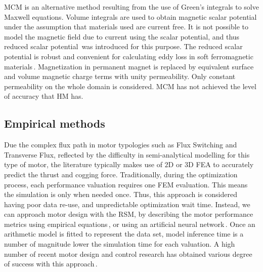         
        \ac{MCM} is an alternative method resulting from the use of Green’s integrals to solve Maxwell equations. Volume integrals are used to obtain magnetic scalar potential under the assumption that materials used are current free. It is not possible to model the magnetic field due to current using the scalar potential, and thus reduced scalar potential\,\cite{Gong2009AnalysisMethod} was introduced for this purpose. The reduced scalar potential is robust and convenient for calculating eddy loss in soft ferromagnetic materials\,\cite{Xu2004TotalCalculation,Bowler1987EddyFunctions,Rubinacci2004AComputation}. Magnetization in permanent magnet is replaced by equivalent surface and volume magnetic charge terms with unity permeability. Only constant permeability on the whole domain is considered. \acs{MCM} has not achieved the level of accuracy that \acs{HM} has.
        
    
    \subsection{Empirical methods}                  \label{Chapter:background/modelling techniques for designing motors/empirical methods}


        Due the complex flux path in motor typologies such as Flux Switching and Transverse Flux, reflected by the difficulty in semi-analytical modelling for this type of motor, the literature typically makes use of $\mathrm{2D}$ or $\mathrm{3D}$ \acs{FEA} to accurately predict the thrust and cogging force. Traditionally, during the optimization process, each performance valuation requires one FEM evaluation. This means the simulation is only when needed once. Thus, this approach is considered having poor data re-use, and unpredictable optimization wait time. Instead, we can approach motor design with the \ac{RSM}, by describing the motor performance metrics using empirical equations\,\cite{Hong2008,Lei2013}, or using an artificial neural network\,\cite{Hadjout2006,Ashabani2010OptimumApproach}. Once an arithmetic model is fitted to represent the data set, model inference time is a number of magnitude lower the simulation time for each valuation. A high number of recent motor design and control research has obtained various degree of success with this approach\,\cite{Hwang2007RotorMethod,Lee2012OptimumMethod,Kim2006OptimalMethodology,Jung2015AdaptiveDrives,Hong2018DesignApplications}. 
        
